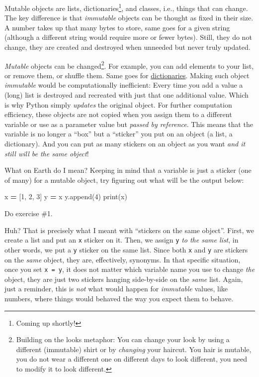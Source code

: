 \documentclass[
]{book}
\newenvironment{Shaded}{\begin{snugshade}}{\end{snugshade}}
\newcommand{\BuiltInTok}[1]{#1}
\newcommand{\DecValTok}[1]{\textcolor[rgb]{0.00,0.00,0.81}{#1}}
\newcommand{\NormalTok}[1]{#1}
\newcommand{\OperatorTok}[1]{\textcolor[rgb]{0.81,0.36,0.00}{\textbf{#1}}}
\begin{document}
Mutable objects are lists, dictionaries\footnote{Coming up shortly!}, and classes, i.e., things that can change. The key difference is that \emph{immutable} objects can be thought as fixed in their size. A number takes up that many bytes to store, same goes for a given string (although a different string would require more or fewer bytes). Still, they do not change, they are created and destroyed when unneeded but never truly updated.

\emph{Mutable} objects can be changed\footnote{Building on the looks metaphor: You can change your look by using a different (immutable) shirt or by \emph{changing} your haircut. You hair is mutable, you do not wear a different one on different days to look different, you need to modify it to look different.}. For example, you can add elements to your list, or remove them, or shuffle them. Same goes for \href{https://docs.python.org/3/tutorial/datastructures.html?highlight=dictionary\#dictionaries}{dictionaries}. Making such object \emph{immutable} would be computationally inefficient: Every time you add a value a (long) list is destroyed and recreated with just that one additional value. Which is why Python simply \emph{updates} the original object. For further computation efficiency, these objects are not copied when you assign them to a different variable or use as a parameter value but \emph{passed by reference}. This means that the variable is no longer a ``box'' but a ``sticker'' you put on an object (a list, a dictionary). And you can put as many stickers on an object as you want \emph{and it still will be the same object}!

What on Earth do I mean? Keeping in mind that a variable is just a sticker (one of many) for a mutable object, try figuring out what will be the output below:

\begin{Shaded}
\begin{Highlighting}[]
\NormalTok{x }\OperatorTok{=}\NormalTok{ [}\DecValTok{1}\NormalTok{, }\DecValTok{2}\NormalTok{, }\DecValTok{3}\NormalTok{]}
\NormalTok{y }\OperatorTok{=}\NormalTok{ x}
\NormalTok{y.append(}\DecValTok{4}\NormalTok{)}
\BuiltInTok{print}\NormalTok{(x)}
\end{Highlighting}
\end{Shaded}

Do exercise \#1.

Huh? That is precisely what I meant with ``stickers on the same object''. First, we create a list and put an \texttt{x} sticker on it. Then, we assign \texttt{y} \emph{to the same list}, in other words, we put a \texttt{y} sticker on the same list. Since both \texttt{x} and \texttt{y} are stickers on the \emph{same} object, they are, effectively, synonyms. In that specific situation, once you set \texttt{x\ =\ y}, it does not matter which variable name you use to change \emph{the} object, they are just two stickers hanging side-by-side on the \emph{same} list. Again, just a reminder, this is \emph{not} what would happen for \emph{immutable} values, like numbers, where things would behaved the way you expect them to behave.
\end{document}

